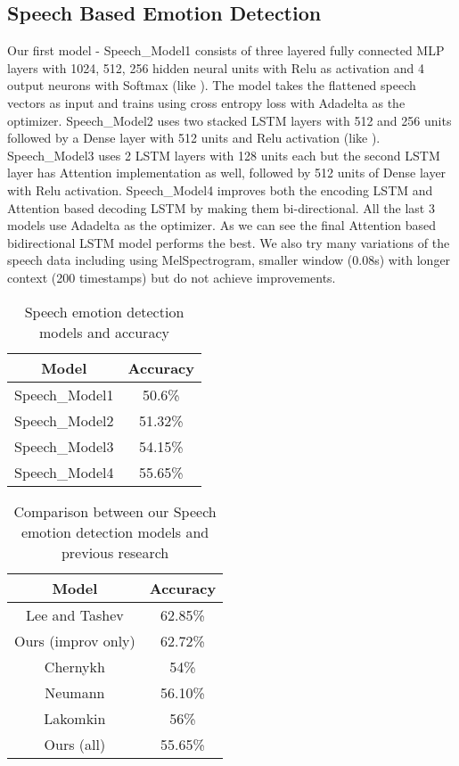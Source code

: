 \documentclass{article}
\begin{document}
\subsection{Speech Based Emotion Detection}

Our first model - Speech\_Model1 consists of three layered fully connected MLP layers with 1024, 512, 256 hidden neural units with Relu as activation and 4 output neurons with Softmax (like \cite{Han}). The model takes the flattened speech vectors as input and trains using cross entropy loss with Adadelta as the optimizer. Speech\_Model2 uses two stacked LSTM layers with 512 and 256 units followed by a Dense layer with 512 units and Relu activation (like \cite{Lee}). Speech\_Model3 uses 2 LSTM layers with 128 units each but the second LSTM layer has Attention implementation as well, followed by 512 units of Dense layer with Relu activation. Speech\_Model4 improves both the encoding LSTM and Attention based decoding LSTM by making them bi-directional. All the last 3 models use Adadelta as the optimizer. As we can see the final Attention based bidirectional LSTM model performs the best. We also try many variations of the speech data including using MelSpectrogram, smaller window (0.08s) with longer context (200 timestamps) but do not achieve improvements. 

\begin{table}[!t]
\renewcommand{\arraystretch}{1.3}
\caption{Speech emotion detection models and accuracy}
\label{table_spch}
\centering
\begin{tabular}{|c||c|}
\hline
Model & Accuracy\\
\hline
Speech\_Model1 & 50.6\% \\
Speech\_Model2 & 51.32\%\\
Speech\_Model3 & 54.15\%\\
Speech\_Model4 & 55.65\%\\
\hline
\end{tabular}
\end{table}

\begin{table}[!t]
\renewcommand{\arraystretch}{1.3}
\caption{Comparison between our Speech emotion detection models and previous research}
\label{table_spch_com}
\centering
\begin{tabular}{|c||c|}
\hline
Model & Accuracy\\
\hline
Lee and Tashev \cite{Lee} & 62.85\% \\
Ours (improv only) & 62.72\%\\
\hline
Chernykh \cite{Chernykh} & 54\% \\
Neumann \cite{Neumann} & 56.10\% \\
Lakomkin \cite{Lakomkin} & 56\% \\
Ours (all) & 55.65\% \\
\hline
\end{tabular}
\end{table}
\end{document}
